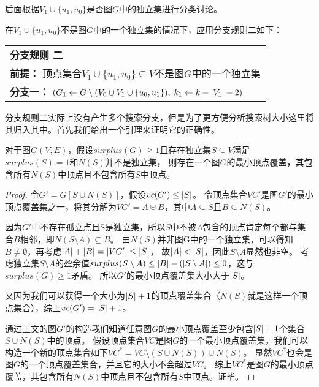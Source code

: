 后面根据$V_1 \cup \{u_1, u_0\}$是否图$G$中的独立集进行分类讨论。

在$V_1 \cup \{u_1, u_0\}$不是图$G$中的一个独立集的情况下，应用分支规则二如下：\\

\begin{tabular}{ p{0.9\headwidth} }
  \hline
  \textbf{分支规则 二 }\\
  \textbf{前提：}  顶点集合$V_1 \cup \{u_1, u_0\}\subseteq V$不是图$G$中的一个独立集\\
  \textbf{分支一：} $(G_1 \leftarrow G \setminus (V_0 \cup V_1 \cup \{u_0, u_1\}),\; k_1 \leftarrow k - \left\vert V_1 \right\vert - 2)$\\
  \hline
\end{tabular} \vspace{0.5cm}

分支规则二实际上没有产生多个搜索分支，但是为了更方便分析搜索树大小这里将其归入其中。首先我们给出一个引理来证明它的正确性。
\begin{lemma} \label{SurplusOne1}
对于图$G(V, E)$，假设$surplus(G) \ge 1$且存在独立集$S \subseteq V$满足$surplus(S) = 1$和$N(S)$并不是独立集，
则存在一个图$G$的最小顶点覆盖，其包含所有$N(S)$中顶点且不包含所有$S$中顶点。
\end{lemma}
\begin{proof}
令$G' = G[S \cup N(S)]$，假设$vc(G')\le \left\vert S \right\vert$。
令顶点集合$VC'$是图$G'$的最小顶点覆盖集之一，将其分解为$VC' = A \uplus B$，其中$A \subseteq S$且$B \subseteq N(S)$。

因为$G'$中不存在孤立点且S是独立集，所以$S$中不被$A$包含的顶点肯定每个都与集合$B$相邻，即$N(S \setminus A) \subseteq B$。
由$N(S)$并非图G中的一个独立集，可以得知$B \neq \emptyset$，再考虑$\left\vert A \right\vert + \left\vert B \right\vert = \left\vert VC' \right\vert \le \left\vert S \right\vert$，
故$\left\vert A \right\vert < \left\vert S \right\vert$，因此$S \setminus A$显然也非空。
考虑独立集$S \setminus A$的盈余值$surplus(S \setminus A) \le \left\vert B \right\vert - (\left\vert S \setminus A \right\vert) \le 0$，这与$surplus(G) \ge 1$矛盾。
所以$G'$的最小顶点覆盖集大小大于$\left\vert S \right\vert$。

又因为我们可以获得一个大小为$\left\vert S \right\vert + 1$的顶点覆盖集合（$N(S)$就是这样一个顶点集合），综上$vc(G') = \left\vert S \right\vert + 1$。

通过上文的图$G'$的构造我们知道任意图$G$的最小顶点覆盖至少包含$\left\vert S \right\vert + 1$个集合$S \cup N(S)$中的顶点。
假设顶点集合$VC$是图$G$的一个最小顶点覆盖集，我们可以构造一个新的顶点集合如下$VC^* = VC \setminus (S \cup N(S)) \cup N(S)$。
显然$VC^*$也会是图$G$的一个顶点覆盖集合，并且它的大小不会超过$VC$。
综上$VC^*$是图$G$的最小顶点覆盖，其包含所有$N(S)$中顶点且不包含所有$S$中顶点。证毕。
\end{proof}

